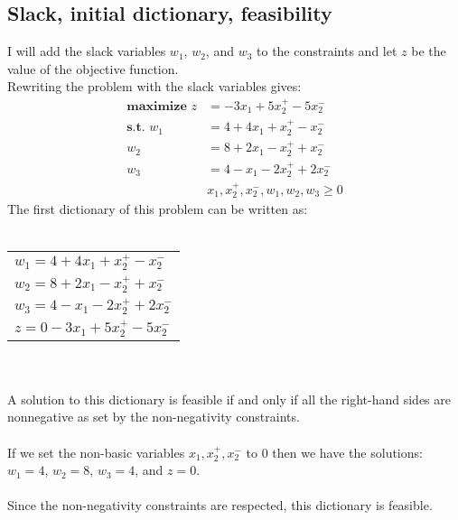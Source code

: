 \documentclass[12pt]{article}
\begin{document}
\subsection*{Slack, initial dictionary, feasibility}
I will add the slack variables $w_{1}$, $w_{2}$, and $w_{3}$ to the constraints and let $z$ be the value of the objective function.\\
Rewriting the problem with the slack variables gives:
\begin{align*}
  \textbf{maximize } z &= -3x_{1} + 5x^{+}_{2} - 5x^{-}_{2}\\
  \textbf{s.t. }     w_{1} &= 4 + 4x_{1} + x^{+}_{2} - x^{-}_{2}\\
                     w_{2} &= 8 + 2x_{1} - x^{+}_{2} + x^{-}_{2}\\
                     w_{3} &= 4 - x_{1} - 2x^{+}_{2} + 2x^{-}_{2}\\
                     &x_{1}, x^{+}_{2}, x^{-}_{2}, w_{1}, w_{2}, w_{3} \geq 0
\end{align*}
The first dictionary of this problem can be written as:\\
\\
\begin{tabular}{l}
  $w_{1} = 4 + 4x_{1} + x^{+}_{2} - x^{-}_{2}$\\
  $w_{2} = 8 + 2x_{1} - x^{+}_{2} + x^{-}_{2}$\\
  $w_{3} = 4 - x_{1} - 2x^{+}_{2} + 2x^{-}_{2}$\\
  \hline
  $z = 0 - 3x_{1} + 5x^{+}_{2} - 5x^{-}_{2}$\\
\end{tabular}
\\
\\
A solution to this dictionary is feasible if and only if all the right-hand sides are nonnegative as set by the non-negativity constraints.\\
\\
If we set the non-basic variables $x_{1}, x^{+}_{2}, x^{-}_{2}$ to 0 then we have the solutions: $w_{1} = 4$, $w_{2} = 8$, $w_{3} = 4$, and $z = 0$.\\
\\
Since the non-negativity constraints are respected, this dictionary is feasible.
\end{document}
